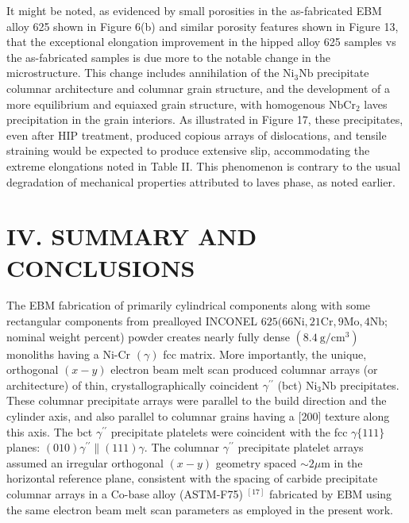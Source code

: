 \documentclass[10pt]{article}
\begin{document}
It might be noted, as evidenced by small porosities in the as-fabricated EBM alloy 625 shown in Figure 6(b) and similar porosity features shown in Figure 13, that the exceptional elongation improvement in the hipped alloy 625 samples vs the as-fabricated samples is due more to the notable change in the microstructure. This change includes annihilation of the $\mathrm{Ni}_{3} \mathrm{Nb}$ precipitate columnar architecture and columnar grain structure, and the development of a more equilibrium and equiaxed grain structure, with homogenous $\mathrm{NbCr}_{2}$ laves precipitation in the grain interiors. As illustrated in Figure 17, these precipitates, even after HIP treatment, produced copious arrays of dislocations, and tensile straining would be expected to produce extensive slip, accommodating the extreme elongations noted in Table II. This phenomenon is contrary to the usual degradation of mechanical properties attributed to laves phase, as noted earlier.

\section*{IV. SUMMARY AND CONCLUSIONS}
The EBM fabrication of primarily cylindrical components along with some rectangular components from prealloyed INCONEL $625(66 \mathrm{Ni}, 21 \mathrm{Cr}, 9 \mathrm{Mo}, 4 \mathrm{Nb}$; nominal weight percent) powder creates nearly fully dense $\left(8.4 \mathrm{~g} / \mathrm{cm}^{3}\right)$ monoliths having a Ni-Cr $(\gamma)$ fcc matrix. More importantly, the unique, orthogonal $(x-y)$ electron beam melt scan produced columnar arrays (or architecture) of thin, crystallographically coincident $\gamma^{\prime \prime}$ (bct) $\mathrm{Ni}_{3} \mathrm{Nb}$ precipitates. These columnar precipitate arrays were parallel to the build direction and the cylinder axis, and also parallel to columnar grains having a [200] texture along this axis. The bct $\gamma^{\prime \prime}$ precipitate platelets were coincident with the fcc $\gamma\{111\}$ planes: $(010) \gamma^{\prime \prime} \|(111) \gamma$. The columnar $\gamma^{\prime \prime}$ precipitate platelet arrays assumed an irregular orthogonal $(x-y)$ geometry spaced $\sim 2 \mu \mathrm{m}$ in the horizontal reference plane, consistent with the spacing of carbide precipitate columnar arrays in a Co-base alloy (ASTM-F75) ${ }^{[17]}$ fabricated by EBM using the same electron beam melt scan parameters as employed in the present work.
\end{document}
